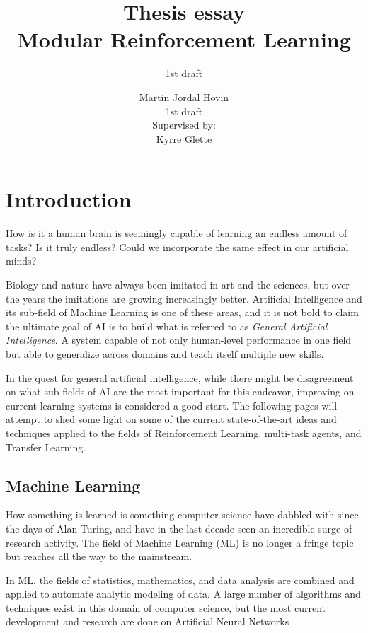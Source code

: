 \documentclass[a4paper,english]{report}
\begin{document}
\title{Thesis essay\\ [0.5cm]Modular Reinforcement Learning}
\subtitle{1st draft}
\author{Martin Jordal Hovin\\
\small 1st draft\\
[3cm]Supervised by:\\
Kyrre Glette}

\maketitle

\tableofcontents

\chapter{Introduction}
How is it a human brain is seemingly capable of learning an endless amount of tasks? Is it truly endless? Could we incorporate the same effect in our artificial minds?
    
Biology and nature have always been imitated in art and the sciences, but over the years the imitations are growing increasingly better. Artificial Intelligence and its sub-field of Machine Learning is one of these areas, and it is not bold to claim the ultimate goal of AI is to build what is referred to as \textit{General Artificial Intelligence}. A system capable of not only human-level performance in one field but able to generalize across domains and teach itself multiple new skills. 

In the quest for general artificial intelligence,  while there might be disagreement on what sub-fields of AI are the most important for this endeavor, improving on current learning systems is considered a good start\cite{mlroadmap}. The following pages will attempt to shed some light on some of the current state-of-the-art ideas and techniques applied to the fields of Reinforcement Learning, multi-task agents, and Transfer Learning. 

\section{Machine Learning}
How something is learned is something computer science have dabbled with since the days of Alan Turing, and have in the last decade seen an incredible surge of research activity. The field of Machine Learning (ML) is no longer a fringe topic but reaches all the way to the mainstream. 

In ML, the fields of statistics, mathematics, and data analysis are combined and applied to automate analytic modeling of data. A large number of algorithms and techniques exist in this domain of computer science, but the most current development and research are done on Artificial Neural Networks 
\end{document}
